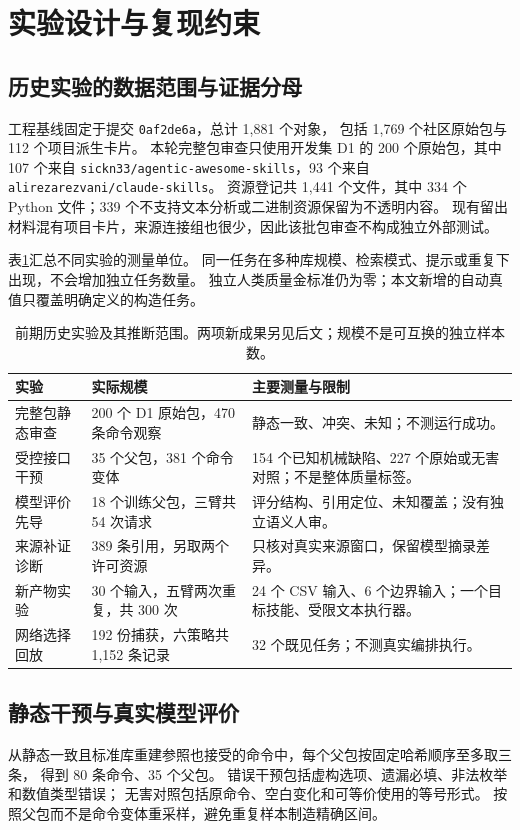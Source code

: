 \section{实验设计与复现约束}
\subsection{历史实验的数据范围与证据分母}
工程基线固定于提交 \texttt{0af2de6a}，总计 1,881 个对象，
包括 1,769 个社区原始包与 112 个项目派生卡片。
本轮完整包审查只使用开发集 D1 的 200 个原始包，其中 107 个来自
\texttt{sickn33/agentic-awesome-skills}，93 个来自 \texttt{alirezarezvani/claude-skills}。
资源登记共 1,441 个文件，其中 334 个 Python 文件；339 个不支持文本分析或二进制资源保留为不透明内容。
现有留出材料混有项目卡片，来源连接组也很少，因此该批包审查不构成独立外部测试。

表\ref{tab:inventory}汇总不同实验的测量单位。
同一任务在多种库规模、检索模式、提示或重复下出现，不会增加独立任务数量。
独立人类质量金标准仍为零；本文新增的自动真值只覆盖明确定义的构造任务。

\begin{table}[t]
\caption{前期历史实验及其推断范围。两项新成果另见后文；规模不是可互换的独立样本数。}
\label{tab:inventory}\centering\small
\begin{tabularx}{\textwidth}{p{}p{}X}
\toprule
实验 & 实际规模 & 主要测量与限制 \\
\midrule
完整包静态审查 & 200 个 D1 原始包，470 条命令观察 & 静态一致、冲突、未知；不测运行成功。\\
受控接口干预 & 35 个父包，381 个命令变体 & 154 个已知机械缺陷、227 个原始或无害对照；不是整体质量标签。\\
模型评价先导 & 18 个训练父包，三臂共 54 次请求 & 评分结构、引用定位、未知覆盖；没有独立语义人审。\\
来源补证诊断 & 389 条引用，另取两个许可资源 & 只核对真实来源窗口，保留模型摘录差异。\\
新产物实验 & 30 个输入，五臂两次重复，共 300 次 & 24 个 CSV 输入、6 个边界输入；一个目标技能、受限文本执行器。\\
网络选择回放 & 192 份捕获，六策略共 1,152 条记录 & 32 个既见任务；不测真实编排执行。\\
\bottomrule
\end{tabularx}
\end{table}

\subsection{静态干预与真实模型评价}
从静态一致且标准库重建参照也接受的命令中，每个父包按固定哈希顺序至多取三条，
得到 80 条命令、35 个父包。
错误干预包括虚构选项、遗漏必填、非法枚举和数值类型错误；
无害对照包括原命令、空白变化和可等价使用的等号形式。
按照父包而不是命令变体重采样，避免重复样本制造精确区间。

